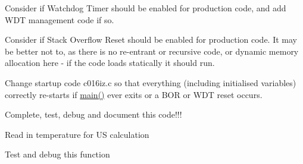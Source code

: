 
\begin{DoxyRefList}
\item[\label{todo__todo000001}%
\hypertarget{todo__todo000001}{}%
File \hyperlink{ConfigRegs18f4520_8h}{Config\+Regs18f4520.h} ]Consider if Watchdog Timer should be enabled for production code, and add W\+D\+T management code if so.

Consider if Stack Overflow Reset should be enabled for production code. It may be better not to, as there is no re-\/entrant or recursive code, or dynamic memory allocation here -\/ if the code loads statically it should run.

Change startup code c016iz.\+c so that everything (including initialised variables) correctly re-\/starts if \hyperlink{HardUItest_8c_a6288eba0f8e8ad3ab1544ad731eb7667}{main()} ever exits or a B\+O\+R or W\+D\+T reset occurs.  
\item[\label{todo__todo000004}%
\hypertarget{todo__todo000004}{}%
Global \hyperlink{LCD_8c_a6d7066138d22070be0234d8b113cf776}{delay} (unsigned int t)]Complete, test, debug and document this code!!! 
\item[\label{todo__todo000005}%
\hypertarget{todo__todo000005}{}%
Global \hyperlink{Range_8h_aff3698f3a7b3b5963d8e6b305a165d71}{range} (void)]Read in temperature for U\+S calculation  
\item[\label{todo__todo000006}%
\hypertarget{todo__todo000006}{}%
Global \hyperlink{Temp_8h_a4946ccbc1990e831667bffded1147c4f}{read\+Tempx2} (void)]Test and debug this function 
\end{DoxyRefList}